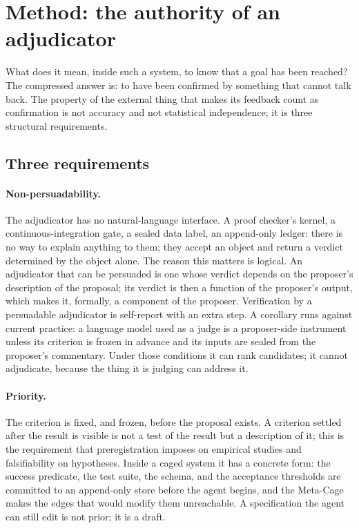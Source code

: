 \section{Method: the authority of an adjudicator}
\label{sec:method}

What does it mean, inside such a system, to know that a goal has been reached? The compressed answer is: to have been confirmed by something that cannot talk back. The property of the external thing that makes its feedback count as confirmation is not accuracy and not statistical independence; it is three structural requirements.

\subsection{Three requirements}
\label{sec:requirements}

\paragraph{Non-persuadability.}
The adjudicator has no natural-language interface. A proof checker's kernel, a continuous-integration gate, a sealed data label, an append-only ledger: there is no way to explain anything to them; they accept an object and return a verdict determined by the object alone. The reason this matters is logical. An adjudicator that can be persuaded is one whose verdict depends on the proposer's description of the proposal; its verdict is then a function of the proposer's output, which makes it, formally, a component of the proposer. Verification by a persuadable adjudicator is self-report with an extra step. A corollary runs against current practice: a language model used as a judge is a proposer-side instrument unless its criterion is frozen in advance and its inputs are sealed from the proposer's commentary. Under those conditions it can rank candidates; it cannot adjudicate, because the thing it is judging can address it.

\paragraph{Priority.}
The criterion is fixed, and frozen, before the proposal exists. A criterion settled after the result is visible is not a test of the result but a description of it; this is the requirement that preregistration imposes on empirical studies and falsifiability on hypotheses. Inside a caged system it has a concrete form: the success predicate, the test suite, the schema, and the acceptance thresholds are committed to an append-only store before the agent begins, and the Meta-Cage makes the edges that would modify them unreachable. A specification the agent can still edit is not prior; it is a draft.

